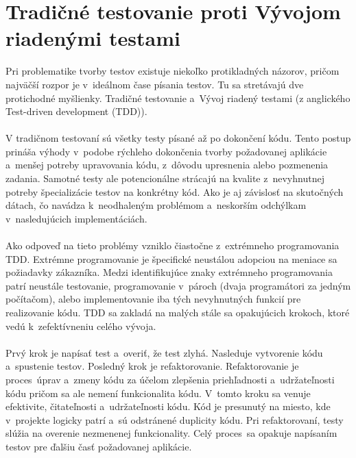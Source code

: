 \documentclass[
  digital, %
  table,   %
oneside,
  nolof,     %
  nolot,     %
]{fithesis3}
\begin{document}
\section{Tradičné testovanie proti Vývojom riadenými testami}

Pri problematike tvorby testov existuje niekoľko protikladných názorov, pričom najväčší rozpor je v~ideálnom čase písania testov. Tu sa stretávajú dve protichodné myšlienky. Tradičné testovanie a~Vývoj riadený testami (z anglického  Test-driven development (TDD))\cite{softwareTesting}. \paragraph{}
V tradičnom testovaní sú všetky testy písané až po dokončení kódu. Tento postup prináša výhody v~podobe rýchleho dokončenia tvorby požadovanej aplikácie a~menšej potreby upravovania kódu, z~dôvodu upresnenia alebo pozmenenia zadania. Samotné testy ale potencionálne strácajú na kvalite z~nevyhnutnej  potreby špecializácie testov na konkrétny kód. Ako je aj závislosť na skutočných dátach, čo navádza k~neodhaleným problémom a~neskorším odchýlkam v~nasledujúcich implementáciách.\paragraph{}
Ako odpoveď na tieto problémy vzniklo čiastočne z~extrémneho programovania TDD. Extrémne programovanie je špecifické neustálou adopciou na meniace sa požiadavky zákazníka. Medzi identifikujúce znaky extrémneho programovania patrí neustále testovanie, programovanie v~pároch (dvaja programátori za jedným počítačom), alebo implementovanie  iba tých nevyhnutných funkcií pre realizovanie kódu. TDD sa zakladá na malých stále sa opakujúcich krokoch, ktoré vedú k~zefektívneniu celého vývoja. \paragraph{}
Prvý krok je napísať test a~overiť, že test zlyhá. Nasleduje vytvorenie kódu a~spustenie testov. Posledný krok je refaktorovanie. Refaktorovanie je proces~úprav a~zmeny kódu za účelom zlepšenia priehľadnosti a~udržateľnosti kódu pričom sa ale nemení funkcionalita kódu. V~tomto kroku sa venuje efektivite, čitateľnosti a~udržateľnosti kódu. Kód je presunutý na miesto, kde v~projekte logicky patrí a~sú odstránené duplicity kódu. Pri refaktorovaní, testy slúžia na overenie nezmenenej funkcionality. Celý proces~sa opakuje napísaním testov pre ďalšiu časť požadovanej aplikácie.
\end{document}
